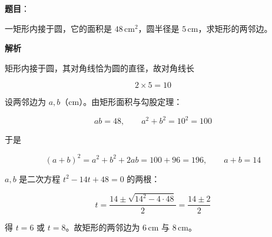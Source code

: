 \begin{answer}

\textbf{题目}：

一矩形内接于圆，它的面积是 $48\,\text{cm}^2$，圆半径是 $5\,\text{cm}$，求矩形的两邻边。

\textbf{解析}

矩形内接于圆，其对角线恰为圆的直径，故对角线长

\nopagebreak[4]
\[
2\times5=10
\]

设两邻边为 $a,b$（cm）。由矩形面积与勾股定理：

\nopagebreak[4]
\[
ab=48,\qquad a^2+b^2=10^2=100
\]

于是

\nopagebreak[4]
\[
(a+b)^2=a^2+b^2+2ab=100+96=196,\qquad a+b=14
\]

$a,b$ 是二次方程 $t^2-14t+48=0$ 的两根：

\nopagebreak[4]
\[
t=\frac{14\pm\sqrt{14^2-4\cdot48}}{2}=\frac{14\pm2}{2}
\]

得 $t=6$ 或 $t=8$。故矩形的两邻边为 $6\,\text{cm}$ 与 $8\,\text{cm}$。


\end{answer}
